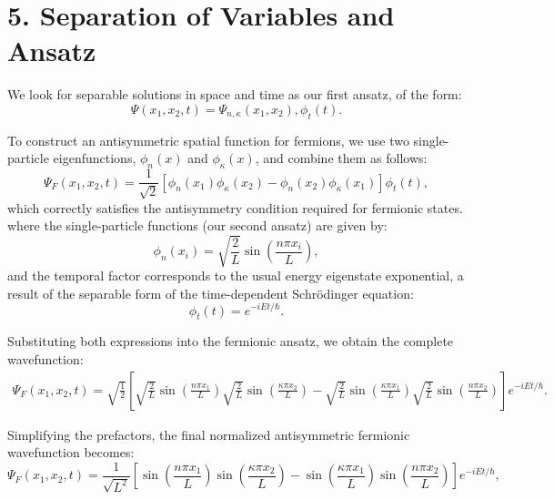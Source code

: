 \section*{5. Separation of Variables and Ansatz}

We look for separable solutions in space and time as our first ansatz, of the form:
\begin{equation}
\Psi(x_1, x_2, t) = \Psi_{n,\kappa}(x_1, x_2),\phi_t(t).
\end{equation}

To construct an antisymmetric spatial function for fermions, we use two single-particle eigenfunctions, $\phi_n(x)$ and $\phi_\kappa(x)$, and combine them as follows:
\begin{equation}
\Psi_F(x_1, x_2, t) = \frac{1}{\sqrt{2}}\left[\phi_n(x_1)\phi_\kappa(x_2) - \phi_n(x_2)\phi_\kappa(x_1)\right]\phi_t(t),
\end{equation}
which correctly satisfies the antisymmetry condition required for fermionic states.
where the single-particle functions (our second ansatz) are given by:
\begin{equation}
    \phi_n(x_i) = \sqrt{\frac{2}{L}}\sin\left(\frac{n\pi x_i}{L}\right),
\end{equation}
and the temporal factor corresponds to the usual energy eigenstate exponential, a result of the separable form of the time-dependent Schrödinger equation:
\begin{equation}
    \phi_t(t) = e^{-iEt/\hbar}.
\end{equation}

Substituting both expressions into the fermionic ansatz, we obtain the complete wavefunction:
\begin{align}
    \Psi_F(x_1, x_2, t) = \sqrt{\frac{1}{2}}\left[\sqrt{\frac{2}{L}}\sin\left(\frac{n\pi x_1}{L}\right)\sqrt{\frac{2}{L}}\sin\left(\frac{\kappa\pi x_2}{L}\right)
    - \sqrt{\frac{2}{L}}\sin\left(\frac{\kappa\pi x_1}{L}\right)\sqrt{\frac{2}{L}}\sin\left(\frac{n\pi x_2}{L}\right)\right] e^{-iEt/\hbar}.
\end{align}

Simplifying the prefactors, the final normalized antisymmetric fermionic wavefunction becomes:
\begin{equation}
    \Psi_F(x_1, x_2, t) =
    \frac{1}{\sqrt{L^2}}
    \left[
    \sin\left(\frac{n\pi x_1}{L}\right)\sin\left(\frac{\kappa\pi x_2}{L}\right)
    - \sin\left(\frac{\kappa\pi x_1}{L}\right)\sin\left(\frac{n\pi x_2}{L}\right)
    \right]
    e^{-iEt/\hbar},
\end{equation}

